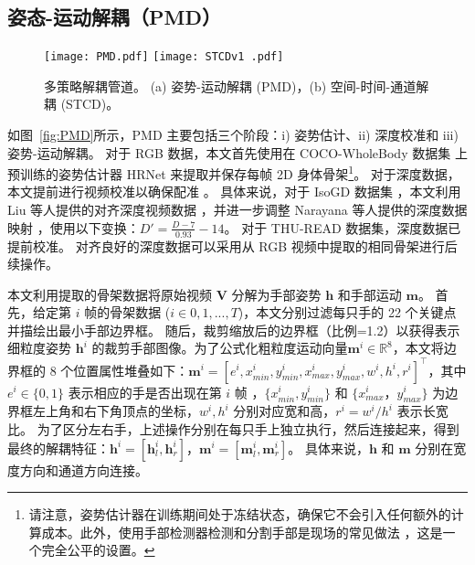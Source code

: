 \subsection{姿态-运动解耦（PMD）}
\label{sec:pose-motion}
\begin{figure}[tb]
\centering
\subcaptionbox{\label{fig:PMD}}
{\texttt{[image: PMD.pdf]}}
\subcaptionbox{\label{fig:STCD}}
{\texttt{[image: STCDv1 .pdf]}}
\caption{多策略解耦管道。 (a) 姿势-运动解耦 (PMD)，(b) 空间-时间-通道解耦 (STCD)。}
\label{fig:handdecomp}
\end{figure}

如图~\ref{fig:PMD}所示，PMD 主要包括三个阶段：i) 姿势估计、ii) 深度校准和 iii) 姿势-运动解耦。
对于 RGB 数据，本文首先使用在 COCO-WholeBody 数据集 \cite{jin2020whole} 上预训练的姿势估计器 HRNet \cite{sun2019deep} 来提取并保存每帧 2D 身体骨架\footnote{请注意，姿势估计器在训练期间处于冻结状态，确保它不会引入任何额外的计算成本。此外，使用手部检测器检测和分割手部是现场的常见做法 \cite{AVOLA2022108762,zhou2021regional,chen2022multi}，这是一个完全公平的设置。}。
对于深度数据，本文提前进行视频校准以确保配准 \cite{liu2017continuous}。
具体来说，对于 IsoGD 数据集 \cite{wan2016chalearn}，本文利用 Liu 等人提供的对齐深度视频数据 \cite{liu2017continuous}，并进一步调整 Narayana 等人提供的深度数据映射 \cite{narayana2018focus}，使用以下变换：$D'=\frac{D-7}{0.93}-14$。
对于 THU-READ 数据集，深度数据已提前校准。
对齐良好的深度数据可以采用从 RGB 视频中提取的相同骨架进行后续操作。

本文利用提取的骨架数据将原始视频 $\mathbf{V}$ 分解为手部姿势 $\mathbf{h}$ 和手部运动 $\mathbf{m}$。
首先，给定第 $i$ 帧的骨架数据 ($i \in 0, 1, ..., T$)，本文分别过滤每只手的 22 个关键点并描绘出最小手部边界框。
随后，裁剪缩放后的边界框（比例=1.2）以获得表示细粒度姿势 $\mathbf{h}^{i}$ 的裁剪手部图像。为了公式化粗粒度运动向量$\mathbf{m}^{i} \in \mathbb{R}^{8}$，本文将边界框的 8 个位置属性堆叠如下：$\mathbf{m}^{i} = \left[e^{i}, x^{i}_{min}, y^{i}_{min}, x^{i}_{max}, y^{i}_{max}, w^{i}, h^{i}, r^{i}\right]^{\top}$，其中 $e^{i} \in \{0, 1\}$ 表示相应的手是否出现在第 $i$ 帧%
，$\{x^{i}_{min}, y^{i}_{min}\}$ 和 $\{x^{i}_{max}， y^{i}_{max}\}$ 为边界框左上角和右下角顶点的坐标，$w^{i}, h^{i}$ 分别对应宽和高，$r^{i}=w^{i}/h^{i}$ 表示长宽比。
为了区分左右手，上述操作分别在每只手上独立执行，然后连接起来，得到最终的解耦特征：$\mathbf{h}^{i} = \left[\mathbf{h}^{i}_l, \mathbf{h}^{i}_r\right]$，$\mathbf{m}^{i} = \left[\mathbf{m}^{i}_l, \mathbf{m}^{i}_r\right]$。
具体来说，$\mathbf{h}$ 和 $\mathbf{m}$ 分别在宽度方向和通道方向连接。

